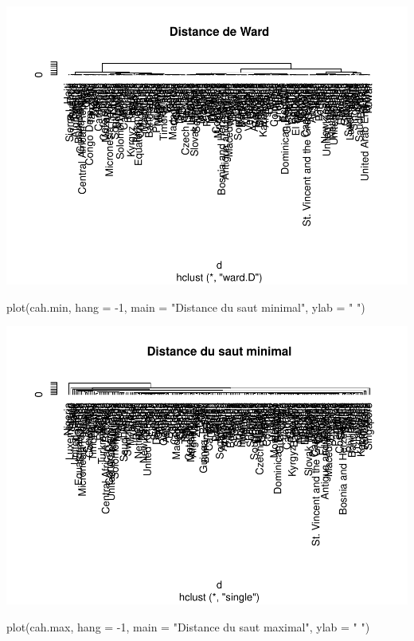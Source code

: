 \documentclass[
]{article}
\newenvironment{Shaded}{}{}
\newcommand{\AttributeTok}[1]{#1}
\newcommand{\DecValTok}[1]{#1}
\newcommand{\FunctionTok}[1]{#1}
\newcommand{\NormalTok}[1]{#1}
\newcommand{\SpecialCharTok}[1]{\textcolor[rgb]{0.00,0.50,0.50}{#1}}
\newcommand{\StringTok}[1]{\textcolor[rgb]{0.00,0.50,0.50}{#1}}
\begin{document}
\includegraphics{Projet_files/figure-latex/unnamed-chunk-12-1.pdf}

\begin{Shaded}
\begin{Highlighting}[]
\FunctionTok{plot}\NormalTok{(cah.min, }\AttributeTok{hang =} \SpecialCharTok{{-}}\DecValTok{1}\NormalTok{, }\AttributeTok{main =} \StringTok{"Distance du saut minimal"}\NormalTok{, }\AttributeTok{ylab =} \StringTok{" "}\NormalTok{)}
\end{Highlighting}
\end{Shaded}

\includegraphics{Projet_files/figure-latex/unnamed-chunk-13-1.pdf}

\begin{Shaded}
\begin{Highlighting}[]
\FunctionTok{plot}\NormalTok{(cah.max, }\AttributeTok{hang =} \SpecialCharTok{{-}}\DecValTok{1}\NormalTok{, }\AttributeTok{main =} \StringTok{"Distance du saut maximal"}\NormalTok{, }\AttributeTok{ylab =} \StringTok{" "}\NormalTok{)}
\end{Highlighting}
\end{Shaded}
\end{document}
